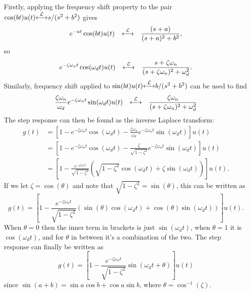 \documentclass[10pt]{beamer}
\newcommand{\ltpair}{{\stackrel{\cal L}{\longleftrightarrow}}}
\begin{document}
Firstly, applying the frequency shift property to the pair $\cos(b t) u(t) \ltpair s/(s^2 + b^2)$ gives
\begin{equation*}
  e^{-at} \cos(b t) u(t) \quad \ltpair \quad \frac{(s+a)}{(s+a)^2 + b^2},
\end{equation*}
so
\begin{equation*}
  e^{-\zeta \omega_n t} \cos(\omega_d t) u(t) \quad \ltpair \quad \frac{s+\zeta \omega_n}{(s+\zeta \omega_n)^2 + \omega_d^2}.
\end{equation*}
Similarly, frequency shift applied to $\sin(b t) u(t) \ltpair b/(s^2 + b^2)$ can be used to find
\begin{equation*}
  \frac{\zeta \omega_n}{\omega_d} e^{-\zeta \omega_n t} \sin(\omega_d t) u(t) \quad \ltpair \quad 
  \frac{\zeta \omega_n}{(s+\zeta \omega_n)^2 + \omega_d^2}
\end{equation*}
The step response can then be found as the inverse Laplace transform:
\begin{align*}
  g(t) &= \left[ 1 - e^{-\zeta \omega_n t} \cos(\omega_d t) 
  - \frac{\zeta \omega_n}{\omega_d} e^{-\zeta \omega_n t} \sin(\omega_d t) \right] u(t) \\
  &= \left[ 1 - e^{-\zeta \omega_n t} \cos(\omega_d t) 
  - \frac{\zeta}{\sqrt{1 - \zeta^2}} e^{-\zeta \omega_n t} \sin(\omega_d t) \right] u(t) \\
  &= \left[ 1 - \frac{e^{-\zeta \omega_n t} }{\sqrt{1 - \zeta^2}} \left( \sqrt{1 - \zeta^2} \cos(\omega_d t) 
  + \zeta \sin(\omega_d t) \right) \right] u(t).
\end{align*}
If we let $\zeta = \cos(\theta)$ and note that $\sqrt{1 - \zeta^2} = \sin(\theta)$, this can be written as
\begin{equation*}
  g(t) = \left[ 1 - \frac{e^{-\zeta \omega_n t} }{\sqrt{1 - \zeta^2}} \left( \sin(\theta) \cos(\omega_d t) 
  + \cos(\theta) \sin(\omega_d t) \right) \right] u(t).
\end{equation*}
When $\theta=0$ then the inner term in brackets is just $\sin(\omega_d t)$, when $\theta=1$ it is $\cos(\omega_d t)$, and for $\theta$ in between it's a combination of the two.  The step response can finally be written as
\begin{equation*}
  g(t) = \left[ 1 - \frac{e^{-\zeta \omega_n t} }{\sqrt{1 - \zeta^2}} \sin(\omega_d t + \theta) \right] u(t)
\end{equation*}
since $\sin(a+b) = \sin a \cos b + \cos a \sin b$, where $\theta = \cos^{-1}(\zeta)$.
\end{document}
